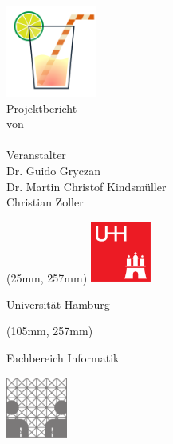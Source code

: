 \makeatletter
\thispagestyle{empty}

\begin{center}
	\textcolor{kiba}{\bf\sffamily\fontsize{48pt}{48pt}\selectfont \@title} \\[.5cm]
	\includegraphics[height=3cm]{logo-kiba} \\[.5cm]
	\textcolor{kiba}{\LARGE\sffamily Projektbericht} \\[.5cm]
    {\large\sffamily von} \\[4pt]
    {\Large \@author \\[1.5cm]}
    {\large\sffamily Veranstalter} \\[12pt]
    {\Large Dr. Guido Gryczan} \\[6pt] {\Large Dr. Martin Christof Kindsmüller\vphantom{y}} \\[6pt] {\Large Christian Zoller} \\[1.5cm]
    {\Large\sffamily \@date}
\end{center}

\vspace{2.5cm}

\begin{textblock*}{80mm}(25mm, 257mm)
	\noindent\includegraphics[width=2cm]{logo-uhh}\;\parbox[b][2cm][c]{60mm}{\sffamily \quad Universität Hamburg}
\end{textblock*}

\begin{textblock*}{80mm}(105mm, 257mm)
	\noindent\hfill\parbox[b][2cm][c]{60mm}{\sffamily\hfill Fachbereich Informatik\quad~}\includegraphics[width=2cm]{logo-fbi}
\end{textblock*}

\makeatother
